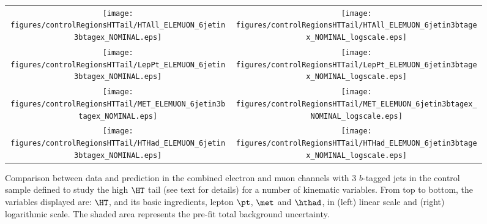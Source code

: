 \begin{figure}[htbp]
\begin{center}
\begin{tabular}{cc}
%
\texttt{[image: figures/controlRegionsHTTail/HTAll\_ELEMUON\_6jetin3btagex\_NOMINAL.eps]} &
\texttt{[image: figures/controlRegionsHTTail/HTAll\_ELEMUON\_6jetin3btagex\_NOMINAL\_logscale.eps]} \\
\texttt{[image: figures/controlRegionsHTTail/LepPt\_ELEMUON\_6jetin3btagex\_NOMINAL.eps]} &
\texttt{[image: figures/controlRegionsHTTail/LepPt\_ELEMUON\_6jetin3btagex\_NOMINAL\_logscale.eps]} \\
\texttt{[image: figures/controlRegionsHTTail/MET\_ELEMUON\_6jetin3btagex\_NOMINAL.eps]} &
\texttt{[image: figures/controlRegionsHTTail/MET\_ELEMUON\_6jetin3btagex\_NOMINAL\_logscale.eps]} \\
\texttt{[image: figures/controlRegionsHTTail/HTHad\_ELEMUON\_6jetin3btagex\_NOMINAL.eps]} &
\texttt{[image: figures/controlRegionsHTTail/HTHad\_ELEMUON\_6jetin3btagex\_NOMINAL\_logscale.eps]} \\

\end{tabular}\caption{\small {Comparison between data and prediction in the combined electron and muon channels with 3 $b$-tagged jets in the control sample
defined to study the high $\HT$ tail (see text for details)  for a number of kinematic
variables. From top to bottom, the variables displayed are: $\HT$, and its basic ingredients, lepton $\pt$, $\met$ and $\hthad$,
in (left) linear scale and (right) logarithmic scale.
The shaded area represents the pre-fit total background uncertainty.}}
\label{fig:ELEMUON_controlHTTail_3btagex_1}
\end{center}
\end{figure}
